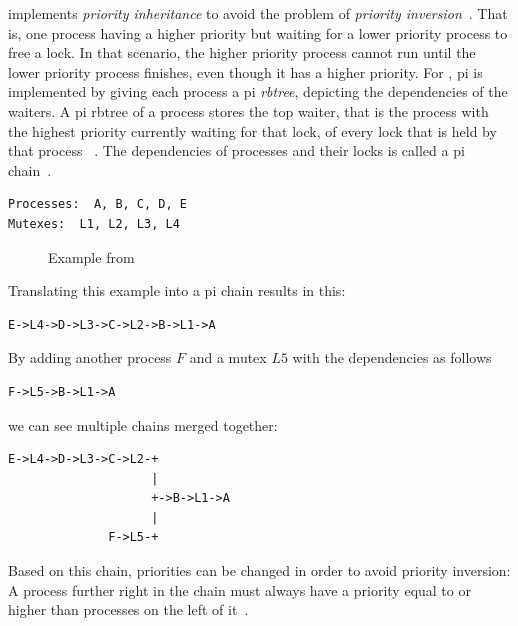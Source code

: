 \documentclass[10pt,twocolumn,a4paper]{article}
\begin{document}
 implements \emph{priority inheritance} to avoid the problem of \emph{priority inversion}~\cite{rostedt_rtmutex_2017}.
That is, one process having a higher priority but waiting for a lower priority process to free a lock.
In that scenario, the higher priority process cannot run until the lower priority process finishes, even though it has a higher priority.
For , \acrfull{pi} is implemented by giving each process a \acrshort{pi} \emph{rbtree}, depicting the dependencies of the waiters.
A \acrshort{pi} rbtree of a process stores the top waiter, that is the process with the highest priority currently waiting for that lock, of every lock that is held by that process ~\cite{rostedt_rtmutex_2017}.
The dependencies of processes and their locks is called a \acrshort{pi} chain~\cite{rostedt_rtmutex_2017}.
\lstset{basicstyle=\small}
\begin{lstlisting}[caption={Example from~\cite{rostedt_rtmutex_2017}}]
Processes:  A, B, C, D, E
Mutexes:  L1, L2, L3, L4
\end{lstlisting}
\begin{figure}[htb]
  \centering
  
  \caption{Example from~\cite{rostedt_rtmutex_2017}}
\end{figure}
Translating this example into a \acrshort{pi} chain results in this:
\begin{lstlisting}[caption={Simple \acrshort{pi} chain~\cite{rostedt_rtmutex_2017}}]
E->L4->D->L3->C->L2->B->L1->A
\end{lstlisting}
By adding another process $F$ and a mutex $L5$ with the dependencies as follows
\begin{lstlisting}[caption={Second \acrshort{pi} chain~\cite{rostedt_rtmutex_2017}}]
F->L5->B->L1->A
\end{lstlisting}
we can see multiple chains merged together:
\begin{lstlisting}[caption={\acrshort{pi} chain~\cite{rostedt_rtmutex_2017}}]
E->L4->D->L3->C->L2-+
                    |
                    +->B->L1->A
                    |
              F->L5-+
\end{lstlisting}
Based on this chain, priorities can be changed in order to avoid priority inversion:
A process further right in the chain must always have a priority equal to or higher than processes on the left of it~\cite{rostedt_rtmutex_2017}.
\newline
\end{document}

